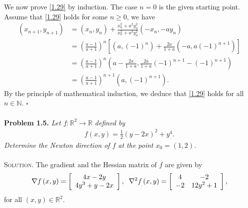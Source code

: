 \documentclass[a4paper]{article}
\numberwithin{equation}{section}
\begin{document}
We now prove \eqref{1.29} by induction. The case $n=0$ is the given starting point. Assume that \eqref{1.29} holds for some $n \ge 0$, we have
\begin{align}
\left( {{x_{n + 1}},{y_{n + 1}}} \right) &= \left( {{x_n},{y_n}} \right) + \frac{{x_n^2 + {a^2}y_n^2}}{{x_n^2 + {a^3}y_n^2}}\left( { - {x_n}, - a{y_n}} \right)\\
 &= {\left( {\frac{{a - 1}}{{a + 1}}} \right)^n}\left[ {\left( {a,{{\left( { - 1} \right)}^n}} \right) + \frac{{2a}}{{1 + a}}\left( { - a,a{{\left( { - 1} \right)}^{n + 1}}} \right)} \right]\\
 &= {\left( {\frac{{a - 1}}{{a + 1}}} \right)^n}\left( {a - \frac{{2a}}{{1 + a}},\frac{{2a}}{{1 + a}}{{\left( { - 1} \right)}^{n + 1}} - {{\left( { - 1} \right)}^{n + 1}}} \right)\\
& = {\left( {\frac{{a - 1}}{{a + 1}}} \right)^{n + 1}}\left( {a,{{\left( { - 1} \right)}^{n + 1}}} \right).
\end{align}
By the principle of mathematical induction, we deduce that \eqref{1.29} holds for all $n\in \mathbb{N}$. \hfill $\square$\\
\\
\textbf{Problem 1.5.} \textit{Let $f:\mathbb{R}^2\to \mathbb{R}$ defined by}
\begin{align}
f\left( {x,y} \right) = \frac{1}{2}{\left( {y - 2x} \right)^2} + {y^4}.
\end{align}
\textit{Determine the Newton direction of $f$ at the point $x_0=\left(1,2\right)$.}\\
\\
\textsc{Solution.} The gradient and the Hessian matrix of $f$ are given by
\begin{align}
\nabla f\left( {x,y} \right) = \left[ {\begin{array}{*{20}{c}}
{4x - 2y}\\
{4{y^3} + y - 2x}
\end{array}} \right],\hspace{0.2cm} {\nabla ^2}f\left( {x,y} \right) = \left[ {\begin{array}{*{20}{c}}
4&{ - 2}\\
{ - 2}&{12{y^2} + 1}
\end{array}} \right],
\end{align}
for all $\left(x,y\right)\in \mathbb{R}^2$. 
\end{document}
